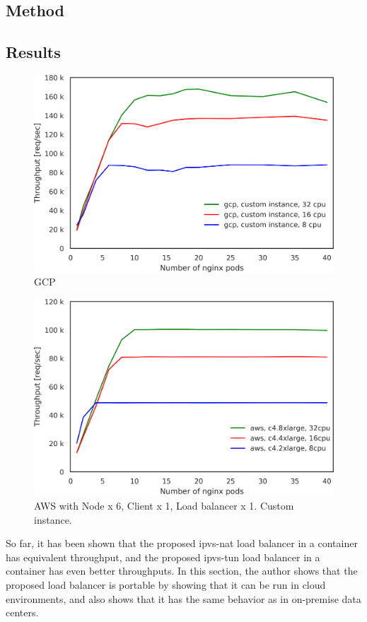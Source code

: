 \subsection{Method}

\subsection{Results}

\begin{figure}[t]
  \centering
  \includegraphics[width=0.8\columnwidth]{Figs/gcp_all_tp}
  \caption{GCP}
  \label{fig:gcp_all_ieice}
\end{figure}

\begin{figure}[t]
  \centering
  \includegraphics[width=0.8\columnwidth]{Figs/aws_c4_tp}
  \caption{AWS with Node x 6, Client x 1, Load balancer x 1. Custom instance. }
  \label{fig:aws_c4_ieice}
\end{figure}

So far, it has been shown that the proposed ipvs-nat load balancer in a container has equivalent throughput, and the proposed ipvs-tun load balancer in a container has even better throughputs.
In this section, the author shows that the proposed load balancer is portable by showing that it can be run in cloud environments, and also shows that it has the same behavior as in on-premise data centers.

